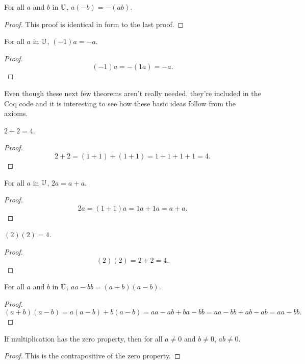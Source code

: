 \documentclass[../../math.tex]{subfiles}
\begin{document}
\begin{theorem}
    For all $a$ and $b$ in $\mathbb{U}$, $a(-b) = -(ab)$.
\end{theorem}
\begin{proof}
    This proof is identical in form to the last proof.
\end{proof}

\begin{theorem}
    For all $a$ in $\mathbb{U}$, $(-1)a = -a$.
\end{theorem}
\begin{proof}
    \[
        (-1)a = -(1a) = -a.
    \]
\end{proof}

Even though these next few theorems aren't really needed, they're included in
the Coq code and it is interesting to see how these basic ideas follow from the
axioms.

\begin{theorem}
    $2 + 2 = 4$.
\end{theorem}
\begin{proof}
    \[
        2 + 2 = (1 + 1) + (1 + 1) = 1 + 1 + 1 + 1 = 4.
    \]
\end{proof}

\begin{theorem}
    For all $a$ in $\mathbb{U}$, $2a = a + a$.
\end{theorem}
\begin{proof}
    \[
        2a = (1 + 1)a = 1a + 1a = a + a.
    \]
\end{proof}

\begin{theorem}
    $(2)(2) = 4$.
\end{theorem}
\begin{proof}
    \[
        (2)(2) = 2 + 2 = 4.
    \]
\end{proof}

\begin{theorem}
    For all $a$ and $b$ in $\mathbb{U}$, $aa - bb = (a + b) (a - b)$.
\end{theorem}
\begin{proof}
    \[
        (a + b)(a - b) = a(a - b) + b(a - b) = aa - ab + ba - bb = aa - bb + ab
        - ab = aa - bb.
    \]
\end{proof}

\begin{theorem} \label{mult_nz}
    If multiplication has the zero property, then for all $a \neq 0$ and $b \neq
    0$, $ab \neq 0$.
\end{theorem}
\begin{proof}
    This is the contrapositive of the zero property.
\end{proof}
\end{document}
